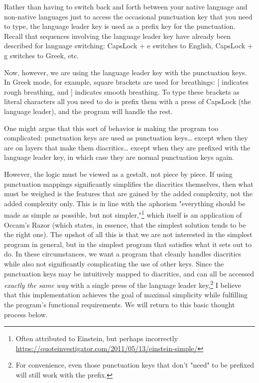 \documentclass[11pt]{article}
\begin{document}
Rather than having to switch back and forth between your native language and non-native languages just to access the occasional punctuation key that you need to type, the language leader key is used as a prefix key for the punctuation. Recall that sequences involving the language leader key have already been described for language switching: CapsLock + e switches to English, CapsLock + g switches to Greek, etc.

Now, however, we are using the language leader key with the punctuation keys. In Greek mode, for example, square brackets are used for breathings: [ indicates rough breathing, and ] indicates smooth breathing. To type these brackets as literal characters all you need to do is prefix them with a press of CapsLock (the language leader), and the program will handle the rest.

One might argue that this sort of behavior is making the program too complicated: punctuation keys are used as punctuation keys\ldots{} except when they are on layers that make them diacritics\ldots{} except when they are prefixed with the language leader key, in which case they are normal punctuation keys again.

However, the logic must be viewed as a gestalt, not piece by piece. If using punctuation mappings significantly simplifies the diacritics themselves, then what must be weighed is the features that are gained by the added complexity, not the added complexity only. This is in line with the aphorism "everything should be made as simple as possible, but not simpler,"\footnote{Often attributed to Einstein, but perhaps incorrectly \url{https://quoteinvestigator.com/2011/05/13/einstein-simple/}} which itself is an application of Occam's Razor (which states, in essence, that the simplest solution tends to be the right one). The upshot of all this is that we are not interested in the simplest program in general, but in the simplest program that satisfies what it sets out to do. In these circumstances, we want a program that cleanly handles diacritics while also not significantly complicating the use of other keys. Since the punctuation keys may be intuitively mapped to diacritics, and can all be accessed \emph{exactly the same way} with a single press of the language leader key,\footnote{For convenience, even those punctuation keys that don't "need" to be prefixed will still work with the prefix.} I believe that this implementation achieves the goal of maximal simplicity while fulfilling the program's functional requirements. We will return to this basic thought process below.
\end{document}
